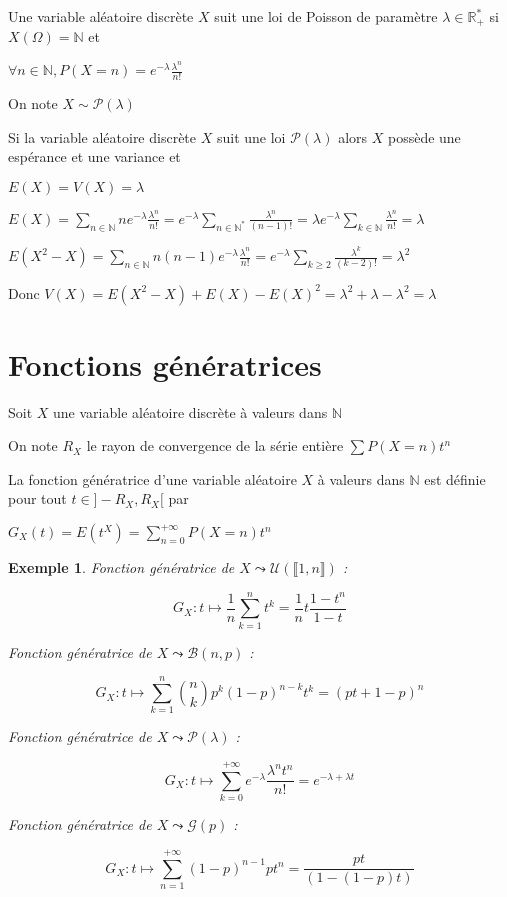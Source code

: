 \documentclass[a4paper,12pt]{book}
\newcommand{\Def}[2]{\begin{tcolorbox}[sharp corners, colback=white,colframe=blue!90!black!75, title=Définition : #1]#2\end{tcolorbox}}
\newcommand{\Prop}[2]{\begin{tcolorbox}[sharp corners, colback=white,colframe=red!90!black!75, title=Proposition : #1]#2\end{tcolorbox}}
\newcommand{\Pre}[1]{\begin{tcolorbox}[sharp corners, colback=white,colframe=green!60!green!30!black!75, title=Preuve]#1\end{tcolorbox}}
\newtheorem{Exe}{Exemple}[section]
\def\R{\mathbb{R}}
\def\N{\mathbb{N}}
\begin{document}
\Def{Loi de Poisson}{Une variable aléatoire discrète $X$ suit une loi de Poisson de paramètre $\lambda\in\R_+^*$ si $X(\Omega)=\N$ et
\par\begin{center}$\forall n\in\N, P(X=n)=e^{-\lambda}\frac{\lambda^n}{n!}$\end{center}
\par On note $X\sim \mathcal{P}(\lambda)$}
\Prop{Espérance et variance d'une loi de Poisson}{Si la variable aléatoire discrète $X$ suit une loi $\mathcal{P}(\lambda)$ alors $X$ possède une espérance et une variance et
\par\begin{center}$E(X)=V(X)=\lambda$\end{center}}
\Pre{$E(X) =\sum\limits_{n\in\N}ne^{-\lambda}\frac{\lambda^n}{n!} =e^{-\lambda}\sum\limits_{n\in\N^*}\frac{\lambda^{n}}{(n-1)!} = \lambda e^{-\lambda}\sum\limits_{k\in\N}\frac{\lambda^n}{n!}=\lambda$
\par $E(X^2-X) = \sum\limits_{n\in\N}n(n-1)e^{-\lambda}\frac{\lambda^n}{n!}=e^{-\lambda}\sum\limits_{k\geq 2}\frac{\lambda^{k}}{(k-2)!}=\lambda^2$
\par Donc $V(X) =  E(X^2 - X) + E(X) - E(X)^2 = \lambda^2 + \lambda - \lambda^2 =\lambda$}


\section{Fonctions génératrices}
Soit $X$ une variable aléatoire discrète à valeurs dans $\N$
\Def{}{On note $R_X$ le rayon de convergence de la série entière $\sum P(X=n)t^n$
\par La fonction génératrice d'une variable aléatoire $X$ à valeurs dans $\N$ est définie pour tout $t\in]-R_X,R_X[$ par
\par\begin{center}$G_X(t)=E(t^X)=\sum\limits_{n=0}^{+\infty}P(X=n)t^n$\end{center}}
\begin{Exe}
Fonction génératrice de $X\leadsto\mathcal{U}(\llbracket 1,n\rrbracket)$ :
\par $$ G_X:t\mapsto \frac{1}{n}\sum\limits_{k=1}^nt^k = \frac{1}{n}t\frac{1-t^n}{1-t}$$
\par Fonction génératrice de $X\leadsto \mathcal{B}(n,p)$ :
\par $$G_X:t\mapsto \sum\limits_{k=1}^n\binom{n}{k}p^k(1-p)^{n-k}t^k = (pt+1-p)^n$$
\par Fonction génératrice de $X\leadsto\mathcal{P}(\lambda)$ :
\par $$G_X:t\mapsto \sum\limits_{k=0}^{+\infty}e^{-\lambda}\frac{\lambda^nt^n}{n!} = e^{-\lambda + \lambda t}$$
\par Fonction génératrice de $X\leadsto \mathcal{G}(p)$ :
\par $$G_X:t\mapsto \sum\limits_{n=1}^{+\infty}(1-p)^{n-1}pt^n = \frac{pt}{(1-(1-p)t)}$$
\end{Exe}
\end{document}
